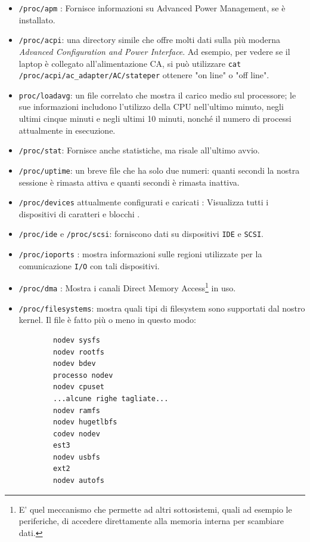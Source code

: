 \documentclass[11pt]{book}
\begin{document}
\begin{itemize}
	\item  \verb*|/proc/apm| : Fornisce informazioni su Advanced Power Management, se è installato.
	\item  \verb*|/proc/acpi|: una directory simile che offre molti dati sulla più moderna \textit{Advanced Configuration and Power Interface}. Ad esempio, per vedere se il laptop è collegato all'alimentazione CA, si può utilizzare  \verb*|cat /proc/acpi/ac_adapter/AC/stateper| ottenere "on line" o "off line". 
	\item \verb*|proc/loadavg|: un file correlato che mostra il carico medio sul processore; le sue informazioni includono l'utilizzo della CPU nell'ultimo minuto, negli ultimi cinque minuti e negli ultimi 10 minuti, nonché il numero di processi attualmente in esecuzione.
	\item \verb*|/proc/stat|: Fornisce anche statistiche, ma risale all'ultimo avvio.
	\item \verb*|/proc/uptime|: un breve file che ha solo due numeri: quanti secondi la nostra sessione è rimasta attiva e quanti secondi è rimasta inattiva.
	\item \verb*|/proc/devices| attualmente configurati e caricati : Visualizza tutti i dispositivi di caratteri e blocchi . 
	\item \verb*|/proc/ide| e \verb*|/proc/scsi|: forniscono dati su dispositivi \verb*|IDE| e \verb*|SCSI|.
	\item \verb*|/proc/ioports| : mostra informazioni sulle regioni utilizzate per la comunicazione \verb*|I/O| con tali dispositivi.
	\item \verb*|/proc/dma| : Mostra i canali Direct Memory Access\footnote{E' quel meccanismo che permette ad altri sottosistemi, quali ad esempio le periferiche, di accedere direttamente alla memoria interna per scambiare dati.} in uso.
	\item \verb*|/proc/filesystems|: mostra quali tipi di filesystem sono supportati dal nostro kernel. Il file è fatto più o meno in questo modo:
	\begin{verbatim}
		nodev sysfs
		nodev rootfs
		nodev bdev
		processo nodev
		nodev cpuset
		...alcune righe tagliate...
		nodev ramfs
		nodev hugetlbfs
		codev nodev
		est3
		nodev usbfs
		ext2
		nodev autofs
	\end{verbatim}

\end{itemize}
\end{document}
